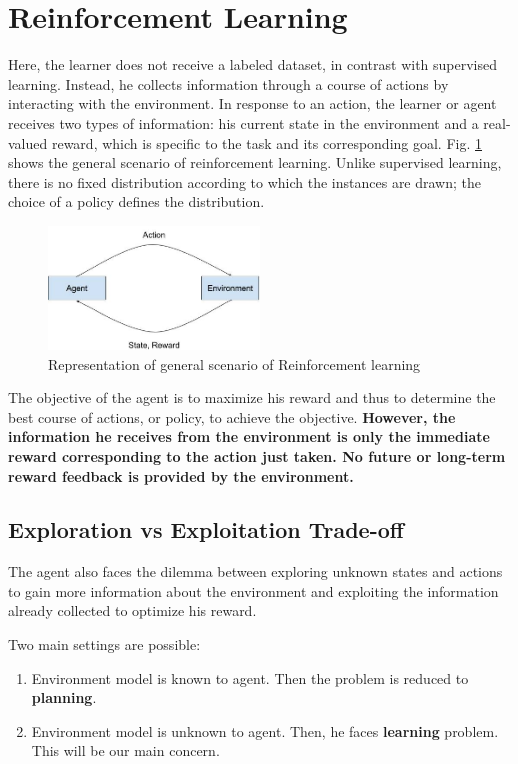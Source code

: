 \documentclass[conference]{IEEEtran}
\begin{document}
\section{Reinforcement Learning}
Here, the learner does not receive a labeled dataset, in contrast with supervised learning. Instead, he collects information through a course of actions by interacting with the environment. In response to an action, the learner or agent receives two types of information: his current state in the environment and a real-valued reward, which is specific to the task and its corresponding goal. Fig. \ref{fig:reinf_learn} shows the general scenario of reinforcement learning. Unlike supervised learning, there is no fixed distribution according to which the instances are drawn; the choice of a policy defines the distribution.

\begin{figure}[h]
\includegraphics[width=0.5\textwidth]{reinf_learn}
\caption[width=\textwidth]{Representation of general scenario of Reinforcement learning}
\label{fig:reinf_learn}
\end{figure}

The objective of the agent is to maximize his reward and thus to determine the best course of actions, or policy, to achieve the objective. \textbf{However, the information he receives from the environment is only the immediate reward corresponding to the action just taken. No future or long-term reward feedback is provided by the environment.}

\subsection{Exploration vs Exploitation Trade-off}
The agent also faces the dilemma between exploring unknown states and actions to gain more information about the environment and exploiting the information already collected to optimize his reward.

Two main settings are possible:
\begin{enumerate}
    \item Environment model is known to agent. Then the problem is reduced to \textbf{planning}.
    \item Environment model is unknown to agent. Then, he faces \textbf{learning} problem. This will be our main concern.
\end{enumerate}
\end{document}
